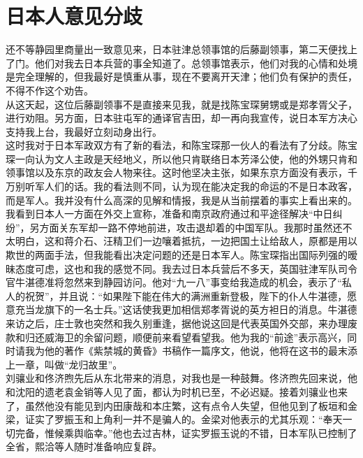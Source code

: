 \fancyhead[RO]{} %
\fancyhead[LE]{} %
\chapter*{日本人意见分歧}
\thispagestyle{empty}
还不等静园里商量出一致意见来，日本驻津总领事馆的后藤副领事，第二天便找上了门。他们对我去日本兵营的事全知道了。总领事馆表示，他们对我的心情和处境是完全理解的，但我最好是慎重从事，现在不要离开天津；他们负有保护的责任，不得不作这个劝告。\\

从这天起，这位后藤副领事不是直接来见我，就是找陈宝琛舅甥或是郑孝胥父子，进行劝阻。另方面，日本驻屯军的通译官吉田，却一再向我宣传，说日本军方决心支持我上台，我最好立刻动身出行。\\

这时我对于日本军政双方有了新的看法，和陈宝琛那一伙人的看法有了分歧。陈宝琛一向认为文人主政是天经地义，所以他只肯联络日本芳泽公使，他的外甥只肯和领事馆以及东京的政友会人物来往。这时他坚决主张，如果东京方面没有表示，千万别听军人们的话。我的看法则不同，认为现在能决定我的命运的不是日本政客，而是军人。我并没有什么高深的见解和情报，我是从当前摆着的事实上看出来的。我看到日本人一方面在外交上宣称，准备和南京政府通过和平途径解决“中日纠纷”，另方面关东军却一路不停地前进，攻击退却着的中国军队。我那时虽然还不太明白，这和蒋介石、汪精卫们一边嚷着抵抗，一边把国土让给敌人，原都是用以欺世的两面手法，但我能看出决定问题的还是日本军人。陈宝琛指出国际列强的暧昧态度可虑，这也和我的感觉不同。我去过日本兵营后不多天，英国驻津军队司令官牛湛德准将忽然来到静园访问。他对“九一八”事变给我造成的机会，表示了“私人的祝贺”，并且说：“如果陛下能在伟大的满洲重新登极，陛下的仆人牛湛德，愿意充当龙旗下的一名士兵。”这话使我更加相信郑孝胥说的英方袒日的消息。牛湛德来访之后，庄士敦也突然和我久别重逢，据他说这回是代表英国外交部，来办理废款和归还威海卫的余留问题，顺便前来看望看望我。他为我的“前途”表示高兴，同时请我为他的著作《紫禁城的黄昏》书稿作一篇序文，他说，他将在这书的最末添上一章，叫做“龙归故里”。\\

刘骧业和佟济煦先后从东北带来的消息，对我也是一种鼓舞。佟济煦先回来说，他和沈阳的遗老袁金销等人见了面，都认为时机已至，不必迟疑。接着刘骧业也来了，虽然他没有能见到内田康哉和本庄繁，这有点令人失望，但他见到了板垣和金梁，证实了罗振玉和上角利一并不是骗人的。金梁对他表示的尤其乐观：“奉天一切完备，惟候乘舆临幸。”他也去过吉林，证实罗振玉说的不错，日本军队已控制了全省，熙洽等人随时准备响应复辟。\\

